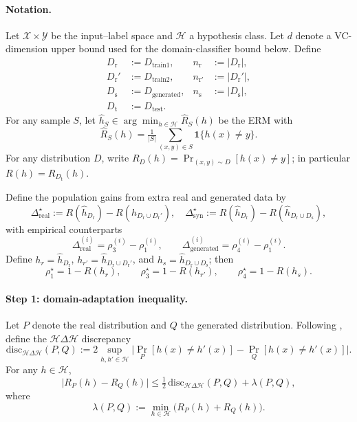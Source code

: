 \paragraph{Notation.}
Let $\mathcal{X}\times\mathcal{Y}$ be the input--label space and $\mathcal{H}$ a hypothesis class. Let $d$ denote a VC-dimension upper bound used for the domain-classifier bound below. Define
\[
\begin{aligned}
D_{\mathrm r} &:= D_{\text{train1}}, & n_{\mathrm r} &:=|D_{\mathrm r}|,\\
D_{\mathrm r}' &:= D_{\text{train2}}, & n_{\mathrm r'} &:=|D_{\mathrm r}'|,\\
D_{\mathrm s} &:= D_{\text{generated}}, & n_{\mathrm s} &:=|D_{\mathrm s}|,\\
D_{\mathrm t} &:= D_{\text{test}}. & &
\end{aligned}
\]
For any sample $S$, let $\hat h_S\in\arg\min_{h\in\mathcal H}\hat R_S(h)$ be the ERM with
\[
\hat R_S(h)=\tfrac1{|S|}\sum_{(x,y)\in S}\mathbf{1}\{h(x)\ne y\}.
\]
For any distribution $D$, write $R_D(h)=\Pr_{(x,y)\sim D}[h(x)\ne y]$; in particular $R(h)=R_{D_{\mathrm t}}(h)$.

Define the population gains from extra real and generated data by
\begin{equation}
\Delta^{\star}_{\text{real}}:=R\!\left(\hat h_{D_{\mathrm r}}\right)-R\!\left(\hat h_{D_{\mathrm r}\cup D_{\mathrm r}'}\right),\quad
\Delta^{\star}_{\text{syn}}:=R\!\left(\hat h_{D_{\mathrm r}}\right)-R\!\left(\hat h_{D_{\mathrm r}\cup D_{\mathrm s}}\right),
\tag{A.2}\label{eq:pop-gains}
\end{equation}
with empirical counterparts
\[
\Delta_{\text{real}}^{(i)}=\rho_3^{(i)}-\rho_1^{(i)},
\qquad
\Delta_{\text{generated}}^{(i)}=\rho_4^{(i)}-\rho_1^{(i)}.
\]
Define $h_r=\hat h_{D_{\mathrm r}}$, $h_{r'}=\hat h_{D_{\mathrm r}\cup D_{\mathrm r}'}$, and $h_s=\hat h_{D_{\mathrm r}\cup D_{\mathrm s}}$; then
\[
\rho_1^\star=1-R(h_r),\qquad
\rho_3^\star=1-R(h_{r'}),\qquad
\rho_4^\star=1-R(h_s).
\]

\paragraph{Step 1: domain-adaptation inequality.}
Let $P$ denote the real distribution and $Q$ the generated distribution. Following \citet{ben2010theory}, define the $\mathcal H\!\Delta\!\mathcal H$ discrepancy
\begin{equation}
\mathrm{disc}_{\mathcal H\Delta\mathcal H}(P,Q):=
2\sup_{h,h'\in\mathcal H}\bigl|\Pr_P[h(x)\ne h'(x)]-\Pr_Q[h(x)\ne h'(x)]\bigr|.
\tag{A.3}\label{eq:DA}
\end{equation}
For any $h\in\mathcal H$,
\begin{equation}
\bigl|R_P(h)-R_Q(h)\bigr|
\le \tfrac12\,\mathrm{disc}_{\mathcal H\Delta\mathcal H}(P,Q)+\lambda(P,Q),
\tag{A.4}\label{eq:DA-inst}
\end{equation}
where
\[
\lambda(P,Q):=\min_{h\in\mathcal H}\bigl(R_P(h)+R_Q(h)\bigr).
\]

